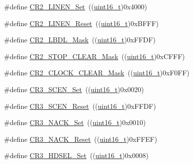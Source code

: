 \begin{DoxyCompactItemize}
\item 
\#define \hyperlink{group___u_s_a_r_t___private___defines_gabc3f2b022d70a11fd0605e58cb23023f}{C\+R2\+\_\+\+L\+I\+N\+E\+N\+\_\+\+Set}~((\hyperlink{_p_e___types_8h_a1f1825b69244eb3ad2c7165ddc99c956}{uint16\+\_\+t})0x4000)
\item 
\#define \hyperlink{group___u_s_a_r_t___private___defines_ga7b8fbe7be4c85c16ea1c1e3c9fa95b05}{C\+R2\+\_\+\+L\+I\+N\+E\+N\+\_\+\+Reset}~((\hyperlink{_p_e___types_8h_a1f1825b69244eb3ad2c7165ddc99c956}{uint16\+\_\+t})0x\+B\+F\+F\+F)
\item 
\#define \hyperlink{group___u_s_a_r_t___private___defines_ga9b365a89de44809a52895090e9050646}{C\+R2\+\_\+\+L\+B\+D\+L\+\_\+\+Mask}~((\hyperlink{_p_e___types_8h_a1f1825b69244eb3ad2c7165ddc99c956}{uint16\+\_\+t})0x\+F\+F\+D\+F)
\item 
\#define \hyperlink{group___u_s_a_r_t___private___defines_ga8a2294276016f30cb361a7f54ad07cd4}{C\+R2\+\_\+\+S\+T\+O\+P\+\_\+\+C\+L\+E\+A\+R\+\_\+\+Mask}~((\hyperlink{_p_e___types_8h_a1f1825b69244eb3ad2c7165ddc99c956}{uint16\+\_\+t})0x\+C\+F\+F\+F)
\item 
\#define \hyperlink{group___u_s_a_r_t___private___defines_ga846e1873279b2b0798cc34d76bd80592}{C\+R2\+\_\+\+C\+L\+O\+C\+K\+\_\+\+C\+L\+E\+A\+R\+\_\+\+Mask}~((\hyperlink{_p_e___types_8h_a1f1825b69244eb3ad2c7165ddc99c956}{uint16\+\_\+t})0x\+F0\+F\+F)
\item 
\#define \hyperlink{group___u_s_a_r_t___private___defines_gab47df7b36b4f1315953f6aa45de2fb61}{C\+R3\+\_\+\+S\+C\+E\+N\+\_\+\+Set}~((\hyperlink{_p_e___types_8h_a1f1825b69244eb3ad2c7165ddc99c956}{uint16\+\_\+t})0x0020)
\item 
\#define \hyperlink{group___u_s_a_r_t___private___defines_ga294c473dc7f8ff3e9cbaa0675c8c75f3}{C\+R3\+\_\+\+S\+C\+E\+N\+\_\+\+Reset}~((\hyperlink{_p_e___types_8h_a1f1825b69244eb3ad2c7165ddc99c956}{uint16\+\_\+t})0x\+F\+F\+D\+F)
\item 
\#define \hyperlink{group___u_s_a_r_t___private___defines_ga950cc9f7251709854754add7d9aaca60}{C\+R3\+\_\+\+N\+A\+C\+K\+\_\+\+Set}~((\hyperlink{_p_e___types_8h_a1f1825b69244eb3ad2c7165ddc99c956}{uint16\+\_\+t})0x0010)
\item 
\#define \hyperlink{group___u_s_a_r_t___private___defines_gabed0cac273ff4faf009e8c35243c1e10}{C\+R3\+\_\+\+N\+A\+C\+K\+\_\+\+Reset}~((\hyperlink{_p_e___types_8h_a1f1825b69244eb3ad2c7165ddc99c956}{uint16\+\_\+t})0x\+F\+F\+E\+F)
\item 
\#define \hyperlink{group___u_s_a_r_t___private___defines_ga0c5c30ea9777d0c8c6f1b5ff85dfca3c}{C\+R3\+\_\+\+H\+D\+S\+E\+L\+\_\+\+Set}~((\hyperlink{_p_e___types_8h_a1f1825b69244eb3ad2c7165ddc99c956}{uint16\+\_\+t})0x0008)

\end{DoxyCompactItemize}
